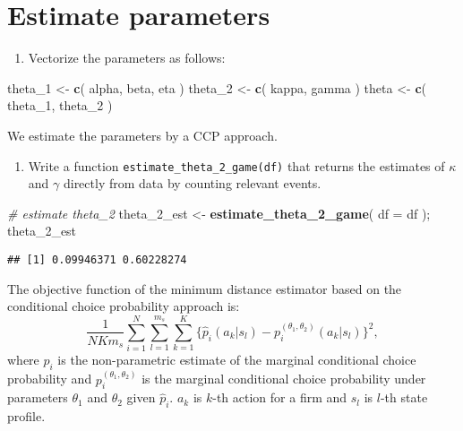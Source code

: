 \documentclass[
]{book}
\newenvironment{Shaded}{\begin{snugshade}}{\end{snugshade}}
\newcommand{\AttributeTok}[1]{\textcolor[rgb]{0.13,0.29,0.53}{#1}}
\newcommand{\CommentTok}[1]{\textcolor[rgb]{0.56,0.35,0.01}{\textit{#1}}}
\newcommand{\FunctionTok}[1]{\textcolor[rgb]{0.13,0.29,0.53}{\textbf{#1}}}
\newcommand{\NormalTok}[1]{#1}
\newcommand{\OtherTok}[1]{\textcolor[rgb]{0.56,0.35,0.01}{#1}}
\providecommand{\tightlist}{%
  \setlength{\itemsep}{0pt}\setlength{\parskip}{0pt}}
\begin{document}
\hypertarget{estimate-parameters-1}{%
\section{Estimate parameters}\label{estimate-parameters-1}}

\begin{enumerate}
\def\labelenumi{\arabic{enumi}.}
\tightlist
\item
  Vectorize the parameters as follows:
\end{enumerate}

\begin{Shaded}
\begin{Highlighting}[]
\NormalTok{theta\_1 }\OtherTok{\textless{}{-}} 
  \FunctionTok{c}\NormalTok{(}
\NormalTok{    alpha, }
\NormalTok{    beta, }
\NormalTok{    eta}
\NormalTok{    )}
\NormalTok{theta\_2 }\OtherTok{\textless{}{-}} 
  \FunctionTok{c}\NormalTok{(}
\NormalTok{    kappa, }
\NormalTok{    gamma}
\NormalTok{    )}
\NormalTok{theta }\OtherTok{\textless{}{-}} 
  \FunctionTok{c}\NormalTok{(}
\NormalTok{    theta\_1, }
\NormalTok{    theta\_2}
\NormalTok{    )}
\end{Highlighting}
\end{Shaded}

We estimate the parameters by a CCP approach.

\begin{enumerate}
\def\labelenumi{\arabic{enumi}.}
\tightlist
\item
  Write a function \texttt{estimate\_theta\_2\_game(df)} that returns the estimates of \(\kappa\) and \(\gamma\) directly from data by counting relevant events.
\end{enumerate}

\begin{Shaded}
\begin{Highlighting}[]
\CommentTok{\# estimate theta\_2}
\NormalTok{theta\_2\_est }\OtherTok{\textless{}{-}} 
  \FunctionTok{estimate\_theta\_2\_game}\NormalTok{(}
    \AttributeTok{df =}\NormalTok{ df}
\NormalTok{  ); }
\NormalTok{theta\_2\_est}
\end{Highlighting}
\end{Shaded}

\begin{verbatim}
## [1] 0.09946371 0.60228274
\end{verbatim}

The objective function of the minimum distance estimator based on the conditional choice probability approach is:
\[
\frac{1}{N K m_s} \sum_{i = 1}^N \sum_{l = 1}^{m_s} \sum_{k = 1}^{K}\{\hat{p}_i(a_k|s_l) - p_i^{(\theta_1, \theta_2)}(a_k|s_l)\}^2,
\]
where \(\hat{p}_i\) is the non-parametric estimate of the marginal conditional choice probability and \(p_i^{(\theta_1, \theta_2)}\) is the marginal conditional choice probability under parameters \(\theta_1\) and \(\theta_2\) given \(\hat{p}_i\). \(a_k\) is \(k\)-th action for a firm and \(s_l\) is \(l\)-th state profile.
\end{document}
